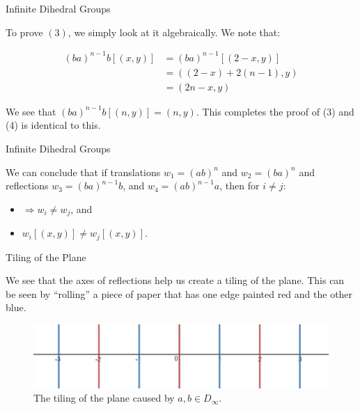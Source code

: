 \documentclass[usenames,dvipsnames]{beamer}
\begin{document}
\begin{frame}{Infinite Dihedral Groups}

To prove $(3)$, we simply look at it algebraically. We note that:

\begin{align*}
(ba)^{n-1}b[(x,y)]
&= (ba)^{n-1}[(2-x,y)] \\
&= ((2-x)+2(n-1),y) \\
&= (2n-x,y)
\end{align*}

We see that $(ba)^{n-1}b[(n,y)]=(n,y)$. This completes the proof of (3) and (4) is identical to this.
\end{frame}

\begin{frame}{Infinite Dihedral Groups}

We can conclude that if translations $w_{1}=(ab)^{n}$ and $w_{2}=(ba)^{n}$ and reflections
$w_{3}=(ba)^{n-1}b$, and $w_{4}=(ab)^{n-1}a$, then for $i\neq j$:

\begin{itemize}
  \item $\Rightarrow w_{i}\neq w_{j}$, and
  \item $w_{i}[(x,y)]\neq w_{j}[(x,y)]$.
\end{itemize}

\end{frame}

\begin{frame}{Tiling of the Plane}

We see that the axes of reflections help us create a tiling of the plane. This can be seen by
``rolling'' a piece of paper that has one edge painted red and the other blue.

\begin{figure}[h]
    \centering
    \includegraphics[width=1\textwidth]{images/2-02-Tiling.png}
    \caption{The tiling of the plane caused by $a,b\in D_\infty$.}
\end{figure}

\end{frame}
\end{document}
